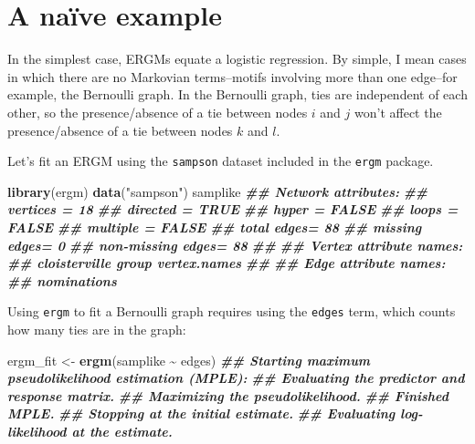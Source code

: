 \documentclass[
]{book}
\newenvironment{Shaded}{\begin{snugshade}}{\end{snugshade}}
\newcommand{\DocumentationTok}[1]{\textcolor[rgb]{0.56,0.35,0.01}{\textbf{\textit{#1}}}}
\newcommand{\FunctionTok}[1]{\textcolor[rgb]{0.13,0.29,0.53}{\textbf{#1}}}
\newcommand{\NormalTok}[1]{#1}
\newcommand{\OtherTok}[1]{\textcolor[rgb]{0.56,0.35,0.01}{#1}}
\newcommand{\SpecialCharTok}[1]{\textcolor[rgb]{0.81,0.36,0.00}{\textbf{#1}}}
\newcommand{\StringTok}[1]{\textcolor[rgb]{0.31,0.60,0.02}{#1}}
\begin{document}
\hypertarget{a-nauxefve-example}{%
\section{A naïve example}\label{a-nauxefve-example}}

In the simplest case, ERGMs equate a logistic regression. By simple, I mean cases in which there are no Markovian terms--motifs involving more than one edge--for example, the Bernoulli graph. In the Bernoulli graph, ties are independent of each other, so the presence/absence of a tie between nodes \(i\) and \(j\) won't affect the presence/absence of a tie between nodes \(k\) and \(l\).

Let's fit an ERGM using the \texttt{sampson} dataset included in the \texttt{ergm} package.

\begin{Shaded}
\begin{Highlighting}[]
\FunctionTok{library}\NormalTok{(ergm)}
\FunctionTok{data}\NormalTok{(}\StringTok{"sampson"}\NormalTok{)}
\NormalTok{samplike}
\DocumentationTok{\#\#  Network attributes:}
\DocumentationTok{\#\#   vertices = 18 }
\DocumentationTok{\#\#   directed = TRUE }
\DocumentationTok{\#\#   hyper = FALSE }
\DocumentationTok{\#\#   loops = FALSE }
\DocumentationTok{\#\#   multiple = FALSE }
\DocumentationTok{\#\#   total edges= 88 }
\DocumentationTok{\#\#     missing edges= 0 }
\DocumentationTok{\#\#     non{-}missing edges= 88 }
\DocumentationTok{\#\# }
\DocumentationTok{\#\#  Vertex attribute names: }
\DocumentationTok{\#\#     cloisterville group vertex.names }
\DocumentationTok{\#\# }
\DocumentationTok{\#\#  Edge attribute names: }
\DocumentationTok{\#\#     nominations}
\end{Highlighting}
\end{Shaded}

Using \texttt{ergm} to fit a Bernoulli graph requires using the \texttt{edges} term, which counts how many ties are in the graph:

\begin{Shaded}
\begin{Highlighting}[]
\NormalTok{ergm\_fit }\OtherTok{\textless{}{-}} \FunctionTok{ergm}\NormalTok{(samplike }\SpecialCharTok{\textasciitilde{}}\NormalTok{ edges)}
\DocumentationTok{\#\# Starting maximum pseudolikelihood estimation (MPLE):}
\DocumentationTok{\#\# Evaluating the predictor and response matrix.}
\DocumentationTok{\#\# Maximizing the pseudolikelihood.}
\DocumentationTok{\#\# Finished MPLE.}
\DocumentationTok{\#\# Stopping at the initial estimate.}
\DocumentationTok{\#\# Evaluating log{-}likelihood at the estimate.}
\end{Highlighting}
\end{Shaded}
\end{document}
